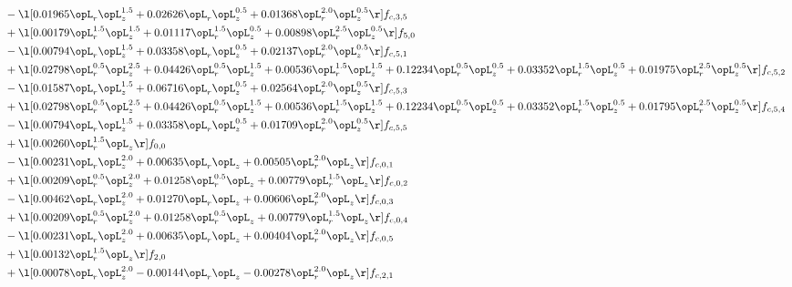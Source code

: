 \begin{alignat}{2}
& - \l[  0.01965 \opL_r \opL_z^{1.5} +  0.02626 \opL_r \opL_z^{0.5} +  0.01368 \opL_r^{2.0} \opL_z^{0.5}  \r] f_{c,3,5} \nonumber \\ 
& + \l[  0.00179 \opL_r^{1.5} \opL_z^{1.5} +  0.01117 \opL_r^{1.5} \opL_z^{0.5} +  0.00898 \opL_r^{2.5} \opL_z^{0.5}  \r] f_{5,0} \nonumber \\ 
& - \l[  0.00794 \opL_r \opL_z^{1.5} +  0.03358 \opL_r \opL_z^{0.5} +  0.02137 \opL_r^{2.0} \opL_z^{0.5}  \r] f_{c,5,1} \nonumber \\ 
& + \l[  0.02798 \opL_r^{0.5} \opL_z^{2.5} +  0.04426 \opL_r^{0.5} \opL_z^{1.5} +  0.00536 \opL_r^{1.5} \opL_z^{1.5} +  0.12234 \opL_r^{0.5} \opL_z^{0.5} +  0.03352 \opL_r^{1.5} \opL_z^{0.5} +  0.01975 \opL_r^{2.5} \opL_z^{0.5}  \r] f_{c,5,2} \nonumber \\ 
& - \l[  0.01587 \opL_r \opL_z^{1.5} +  0.06716 \opL_r \opL_z^{0.5} +  0.02564 \opL_r^{2.0} \opL_z^{0.5}  \r] f_{c,5,3} \nonumber \\ 
& + \l[  0.02798 \opL_r^{0.5} \opL_z^{2.5} +  0.04426 \opL_r^{0.5} \opL_z^{1.5} +  0.00536 \opL_r^{1.5} \opL_z^{1.5} +  0.12234 \opL_r^{0.5} \opL_z^{0.5} +  0.03352 \opL_r^{1.5} \opL_z^{0.5} +  0.01795 \opL_r^{2.5} \opL_z^{0.5}  \r] f_{c,5,4} \nonumber \\ 
& - \l[  0.00794 \opL_r \opL_z^{1.5} +  0.03358 \opL_r \opL_z^{0.5} +  0.01709 \opL_r^{2.0} \opL_z^{0.5}  \r] f_{c,5,5} \nonumber \\ 
& + \l[  0.00260 \opL_r^{1.5} \opL_z  \r] f_{0,0} \nonumber \\ 
& - \l[  0.00231 \opL_r \opL_z^{2.0} +  0.00635 \opL_r \opL_z +  0.00505 \opL_r^{2.0} \opL_z  \r] f_{c,0,1} \nonumber \\ 
& + \l[  0.00209 \opL_r^{0.5} \opL_z^{2.0} +  0.01258 \opL_r^{0.5} \opL_z +  0.00779 \opL_r^{1.5} \opL_z  \r] f_{c,0,2} \nonumber \\ 
& - \l[  0.00462 \opL_r \opL_z^{2.0} +  0.01270 \opL_r \opL_z +  0.00606 \opL_r^{2.0} \opL_z  \r] f_{c,0,3} \nonumber \\ 
& + \l[  0.00209 \opL_r^{0.5} \opL_z^{2.0} +  0.01258 \opL_r^{0.5} \opL_z +  0.00779 \opL_r^{1.5} \opL_z  \r] f_{c,0,4} \nonumber \\ 
& - \l[  0.00231 \opL_r \opL_z^{2.0} +  0.00635 \opL_r \opL_z +  0.00404 \opL_r^{2.0} \opL_z  \r] f_{c,0,5} \nonumber \\ 
& + \l[  0.00132 \opL_r^{1.5} \opL_z  \r] f_{2,0} \nonumber \\ 
& + \l[  0.00078 \opL_r \opL_z^{2.0}   -0.00144 \opL_r \opL_z   -0.00278 \opL_r^{2.0} \opL_z  \r] f_{c,2,1} \nonumber \\ 

\end{alignat}

